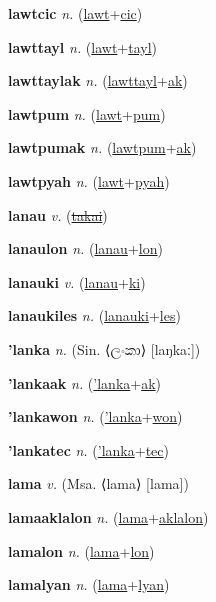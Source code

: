 \textbf{\hypertarget{lawtcic}{lawtcic}} \textit{n.} (\hyperlink{lawt}{lawt}+\allowbreak \hyperlink{cic}{cic})


\textbf{\hypertarget{lawttayl}{lawttayl}} \textit{n.} (\hyperlink{lawt}{lawt}+\allowbreak \hyperlink{tayl}{tayl})


\textbf{\hypertarget{lawttaylak}{lawttaylak}} \textit{n.} (\hyperlink{lawttayl}{lawttayl}+\allowbreak \hyperlink{ak}{ak})


\textbf{\hypertarget{lawtpum}{lawtpum}} \textit{n.} (\hyperlink{lawt}{lawt}+\allowbreak \hyperlink{pum}{pum})


\textbf{\hypertarget{lawtpumak}{lawtpumak}} \textit{n.} (\hyperlink{lawtpum}{lawtpum}+\allowbreak \hyperlink{ak}{ak})


\textbf{\hypertarget{lawtpyah}{lawtpyah}} \textit{n.} (\hyperlink{lawt}{lawt}+\allowbreak \hyperlink{pyah}{pyah})


\textbf{\hypertarget{lanau}{lanau}} \textit{v.} (\hyperlink{takai}{\sout{takai}})


\textbf{\hypertarget{lanaulon}{lanaulon}} \textit{n.} (\hyperlink{lanau}{lanau}+\allowbreak \hyperlink{lon}{lon})


\textbf{\hypertarget{lanauki}{lanauki}} \textit{v.} (\hyperlink{lanau}{lanau}+\allowbreak \hyperlink{ki}{ki})


\textbf{\hypertarget{lanaukiles}{lanaukiles}} \textit{n.} (\hyperlink{lanauki}{lanauki}+\allowbreak \hyperlink{les}{les})


\textbf{\hypertarget{'lanka}{'lanka}} \textit{n.} (Sin. ⟨{\sinhala{}ලංකා}⟩ [laŋkaː])


\textbf{\hypertarget{'lankaak}{'lankaak}} \textit{n.} (\hyperlink{'lanka}{'lanka}+\allowbreak \hyperlink{ak}{ak})


\textbf{\hypertarget{'lankawon}{'lankawon}} \textit{n.} (\hyperlink{'lanka}{'lanka}+\allowbreak \hyperlink{won}{won})


\textbf{\hypertarget{'lankatec}{'lankatec}} \textit{n.} (\hyperlink{'lanka}{'lanka}+\allowbreak \hyperlink{tec}{tec})


\textbf{\hypertarget{lama}{lama}} \textit{v.} (Msa. ⟨lama⟩ [lama])


\textbf{\hypertarget{lamaaklalon}{lamaaklalon}} \textit{n.} (\hyperlink{lama}{lama}+\allowbreak \hyperlink{aklalon}{aklalon})


\textbf{\hypertarget{lamalon}{lamalon}} \textit{n.} (\hyperlink{lama}{lama}+\allowbreak \hyperlink{lon}{lon})


\textbf{\hypertarget{lamalyan}{lamalyan}} \textit{n.} (\hyperlink{lama}{lama}+\allowbreak \hyperlink{lyan}{lyan})



